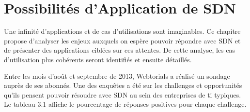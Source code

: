 
\chapter{Possibilités d'Application de SDN}


Une infinité d'applications et de cas d'utilisations sont imaginables. Ce chapitre propose d'analyser les enjeux auxquels on espère pouvoir répondre avec SDN et de présenter des applications ciblées sur ces attentes. De cette analyse, les cas d'utilisation plus cohérents seront identifiés et ensuite détaillés.

 

Entre les mois d'août et septembre de 2013, Webtorials a réalisé un sondage auprès de ses abonnés. Une des enquêtes a été sur les challenges et opportunités qu'ils pensent pouvoir résoudre avec SDN au sein des entreprises de \gls{ti} typiques. Le tableau 3.1 affiche le pourcentage de réponses positives pour chaque challenge. \cite{2013GuideSDNNVUseCases}

